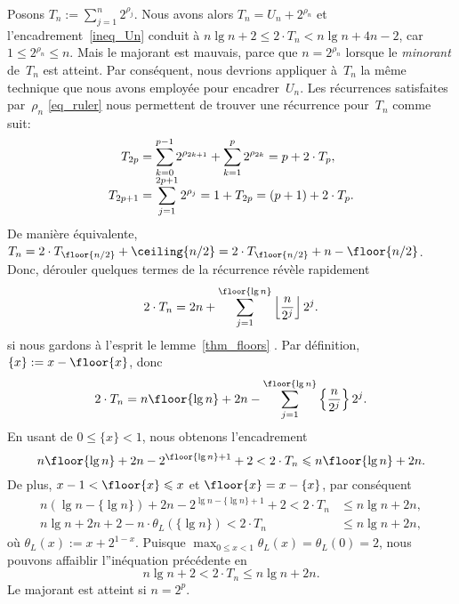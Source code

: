 Posons \(T_n := \sum_{j=1}^{n}{2^{\rho_{j}}}\). Nous avons alors \(T_n
= U_n + 2^{\rho_n}\) et l'encadrement~\eqref{ineq_Un} conduit à \(n\lg
n + 2 \leqslant 2 \cdot T_n < n\lg n + 4n - 2\), car \(1 \leqslant
2^{\rho_n} \leqslant n\). Mais le majorant est mauvais, parce que \(n
= 2^{\rho_n}\) lorsque le \emph{minorant} de~\(T_n\) est atteint. Par
conséquent, nous devrions appliquer à~\(T_n\) la même technique que
nous avons employée pour encadrer~\(U_n\). Les récurrences satisfaites
par~\(\rho_n\) \eqref{eq_ruler} nous permettent de trouver une
récurrence pour~\(T_n\) comme suit:
\begin{align*}
T_{2p} &= \sum_{k=0}^{\smash[t]{p-1}}{2^{\rho_{2k+1}}} +
\sum_{k=1}^{p}{2^{\rho_{2k}}} = p + 2 \cdot T_{p},\\
 T_{2p+1}
&= \sum_{j=1}^{\smash[t]{2p+1}}{2^{\rho_{j}}} = 1 + T_{2p} = (p + 1) +
2 \cdot T_{p}.
\end{align*}
De manière équivalente, \(T_{n} = 2 \cdot T_{\floor{n/2}} +
\ceiling{n/2} = 2 \cdot T_{\floor{n/2}} + n - \floor{n/2}\). Donc,
dérouler quelques termes de la récurrence révèle rapidement
\begin{equation*}
2 \cdot T_n = 2n + \sum_{j=1}^{\floor{\lg n}}
            {\left\lfloor{\frac{n}{2^j}}\right\rfloor 2^j}.
\end{equation*}
si nous gardons à l'esprit le lemme~\ref{thm_floors}
. Par définition, \(\{x\} := x - \floor{x}\),
donc
\begin{equation*}
2 \cdot T_n = n\floor{\lg n} + 2n - \sum_{j=1}^{\floor{\lg
    n}}\left\lbrace\frac{n}{2^j}\right\rbrace 2^j.
\end{equation*}
En usant de \(0 \leqslant \{x\} < 1\), nous obtenons l'encadrement
\begin{equation*}
n\floor{\lg n} + 2n - 2^{\floor{\lg n}+1} + 2 < 2 \cdot T_n \leqslant
n\floor{\lg n} + 2n.
\end{equation*}
De plus, \(x - 1 < \floor{x} \leqslant x\) et \(\floor{x} = x -
\{x\}\), par conséquent
\begin{align*}
n(\lg n - \{\lg n\}) + 2n - 2^{\lg n - \{\lg n\} +
  1} + 2 < 2 \cdot T_n &\leqslant n\lg n + 2n,\\
n\lg n + 2n + 2 - n \cdot \theta_L(\{\lg n\}) < 2 \cdot T_n
&\leqslant n\lg n + 2n,
\end{align*}
où \(\theta_L(x) := x + 2^{1 - x}\). Puisque \(\max_{0 \leqslant x <
  1}\theta_L(x) = \theta_L(0) = 2\), nous pouvons affaiblir
l''inéquation précédente en
\begin{equation}
n\lg n + 2 < 2 \cdot T_n \leqslant n\lg n + 2n.
\label{ineq_Tn}
\end{equation}
Le majorant est atteint si \(n=2^p\).

